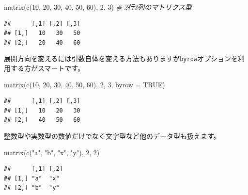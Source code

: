 \documentclass[
  12pt,
]{book}
\newenvironment{Shaded}{\begin{snugshade}}{\end{snugshade}}
\newcommand{\AttributeTok}[1]{\textcolor[rgb]{0.77,0.63,0.00}{#1}}
\newcommand{\CommentTok}[1]{\textcolor[rgb]{0.56,0.35,0.01}{\textit{#1}}}
\newcommand{\ConstantTok}[1]{\textcolor[rgb]{0.00,0.00,0.00}{#1}}
\newcommand{\DecValTok}[1]{\textcolor[rgb]{0.00,0.00,0.81}{#1}}
\newcommand{\FunctionTok}[1]{\textcolor[rgb]{0.00,0.00,0.00}{#1}}
\newcommand{\NormalTok}[1]{#1}
\newcommand{\StringTok}[1]{\textcolor[rgb]{0.31,0.60,0.02}{#1}}
\begin{document}
\begin{Shaded}
\begin{Highlighting}[]
\FunctionTok{matrix}\NormalTok{(}\FunctionTok{c}\NormalTok{(}\DecValTok{10}\NormalTok{, }\DecValTok{20}\NormalTok{, }\DecValTok{30}\NormalTok{, }\DecValTok{40}\NormalTok{, }\DecValTok{50}\NormalTok{, }\DecValTok{60}\NormalTok{), }\DecValTok{2}\NormalTok{, }\DecValTok{3}\NormalTok{)     }\CommentTok{\# 2行3列のマトリクス型}
\end{Highlighting}
\end{Shaded}

\begin{verbatim}
##      [,1] [,2] [,3]
## [1,]   10   30   50
## [2,]   20   40   60
\end{verbatim}

展開方向を変えるには引数自体を変える方法もありますが\texttt{byrow}オプションを利用する方がスマートです。

\begin{Shaded}
\begin{Highlighting}[]
\FunctionTok{matrix}\NormalTok{(}\FunctionTok{c}\NormalTok{(}\DecValTok{10}\NormalTok{, }\DecValTok{20}\NormalTok{, }\DecValTok{30}\NormalTok{, }\DecValTok{40}\NormalTok{, }\DecValTok{50}\NormalTok{, }\DecValTok{60}\NormalTok{), }\DecValTok{2}\NormalTok{, }\DecValTok{3}\NormalTok{, }\AttributeTok{byrow =} \ConstantTok{TRUE}\NormalTok{)}
\end{Highlighting}
\end{Shaded}

\begin{verbatim}
##      [,1] [,2] [,3]
## [1,]   10   20   30
## [2,]   40   50   60
\end{verbatim}

整数型や実数型の数値だけでなく文字型など他のデータ型も扱えます。

\begin{Shaded}
\begin{Highlighting}[]
\FunctionTok{matrix}\NormalTok{(}\FunctionTok{c}\NormalTok{(}\StringTok{"a"}\NormalTok{, }\StringTok{"b"}\NormalTok{, }\StringTok{"x"}\NormalTok{, }\StringTok{"y"}\NormalTok{), }\DecValTok{2}\NormalTok{, }\DecValTok{2}\NormalTok{)}
\end{Highlighting}
\end{Shaded}

\begin{verbatim}
##      [,1] [,2]
## [1,] "a"  "x" 
## [2,] "b"  "y"
\end{verbatim}
\end{document}

